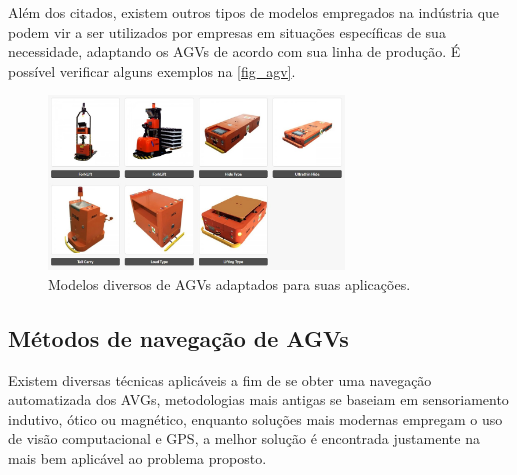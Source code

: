 Além dos citados, existem outros tipos de modelos empregados na indústria que
podem vir a ser utilizados por empresas em situações específicas de sua
necessidade, adaptando os AGVs de acordo com sua linha de produção. É possível
verificar alguns exemplos na \autoref{fig_agv}.

\begin{figure}[htb]
        \centering
        \caption{\label{fig_agv}Modelos diversos de AGVs adaptados para suas aplica{\c c}{\~o}es.}
        \includegraphics[width=0.7\textwidth]{images/suzhou-agv-robot-products.jpg}
\end{figure}


\subsection{M{\'e}todos de navega{\c c}{\~a}o de AGVs}

Existem diversas técnicas aplicáveis a fim de se obter uma navegação
automatizada dos AVGs, metodologias mais antigas se baseiam em sensoriamento
indutivo, ótico ou magnético, enquanto soluções mais modernas empregam o uso de visão
computacional e GPS, a melhor solução é encontrada justamente na mais bem
aplicável ao problema proposto.


